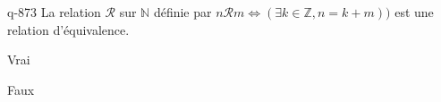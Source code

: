 \begin{truefalse}{q-873}
La relation $\mathcal R$ sur $\mathbb N$ définie par $n\mathcal R m \iff (\exists k\in\mathbb Z,n=k+m))$ est une relation d'équivalence.
\item* Vrai
\item Faux
\end{truefalse}

